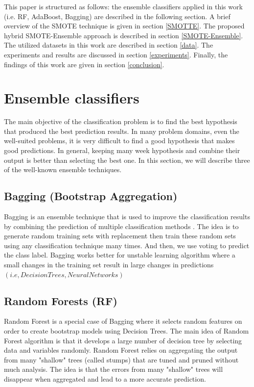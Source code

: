 \documentclass[runningheads,a4paper]{llncs}
\begin{document}

This paper is structured as follows: the ensemble classifiers applied in this work (i.e. RF, AdaBoost, Bagging) are described in the following section. A brief overview of the SMOTE technique is given in section \ref{SMOTTE}. The proposed hybrid SMOTE-Ensemble approach is described in section \ref{SMOTE-Ensemble}. The utilized datasets in this work are described in section \ref{data}. The experiments and results are discussed in section \ref{experiments}. Finally, the findings of this work are given in section \ref{conclusion}.






\section{Ensemble classifiers}
\label{ensembles}
The main objective of the classification problem is to find the best hypothesis that produced the best prediction results. In many problem domains, even the well-suited problems, it is very difficult to find a good hypothesis that makes good predictions. In general, keeping many week hypothesis and combine their output is better than selecting the best one.
In this section, we will describe three of the well-known ensemble techniques.

\subsection{Bagging (Bootstrap Aggregation)}
Bagging is an ensemble technique that is used to improve the classification results by combining the prediction of multiple classification methods \cite{Breiman1996}. The idea is to generate random training sets with replacement then train these random sets using any classification technique many times. And then, we use voting to predict the class label.
Bagging works better for unstable  learning algorithm where a small changes in the training set result in large changes in predictions $(i.e, Decision Trees,  Neural Networks)$

\subsection{Random Forests (RF)}
Random Forest \cite{breiman2001random} is a special case of Bagging where it selects  random features on order to create bootstrap models using Decision Trees. The main idea of Random Forest algorithm is that it develops a large number of decision tree by selecting data and variables randomly.
Random Forest relies on aggregating the output from many "shallow" trees (called stumps) that are tuned and pruned without much analysis. The idea is that the errors from many "shallow" trees will disappear when aggregated and lead to a more accurate prediction.
\end{document}

